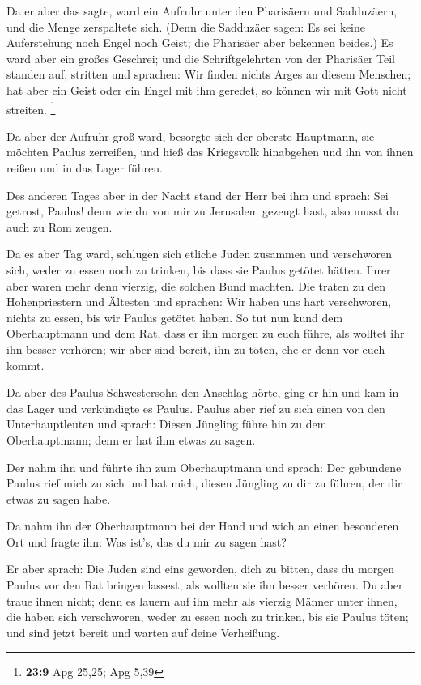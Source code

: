  Da er aber das sagte, ward ein Aufruhr unter den
Pharisäern und Sadduzäern, und die Menge zerspaltete sich.
 (Denn die Sadduzäer sagen: Es sei keine Auferstehung noch
Engel noch Geist; die Pharisäer aber bekennen beides.)  Es
ward aber ein großes Geschrei; und die Schriftgelehrten von der
Pharisäer Teil standen auf, stritten und sprachen: Wir finden nichts
Arges an diesem Menschen; hat aber ein Geist oder ein Engel mit ihm
geredet, so können wir mit Gott nicht streiten. \footnote{\textbf{23:9}
  Apg 25,25; Apg 5,39}

 Da aber der Aufruhr groß ward, besorgte sich der oberste
Hauptmann, sie möchten Paulus zerreißen, und hieß das Kriegsvolk
hinabgehen und ihn von ihnen reißen und in das Lager führen.

 Des anderen Tages aber in der Nacht stand der Herr bei
ihm und sprach: Sei getrost, Paulus! denn wie du von mir zu Jerusalem
gezeugt hast, also musst du auch zu Rom zeugen.

 Da es aber Tag ward, schlugen sich etliche Juden
zusammen und verschworen sich, weder zu essen noch zu trinken, bis dass
sie Paulus getötet hätten.  Ihrer aber waren mehr denn
vierzig, die solchen Bund machten.  Die traten zu den
Hohenpriestern und Ältesten und sprachen: Wir haben uns hart
verschworen, nichts zu essen, bis wir Paulus getötet haben.
 So tut nun kund dem Oberhauptmann und dem Rat, dass er
ihn morgen zu euch führe, als wolltet ihr ihn besser verhören; wir aber
sind bereit, ihn zu töten, ehe er denn vor euch kommt.

 Da aber des Paulus Schwestersohn den Anschlag hörte,
ging er hin und kam in das Lager und verkündigte es Paulus.
 Paulus aber rief zu sich einen von den Unterhauptleuten
und sprach: Diesen Jüngling führe hin zu dem Oberhauptmann; denn er hat
ihm etwas zu sagen.

 Der nahm ihn und führte ihn zum Oberhauptmann und
sprach: Der gebundene Paulus rief mich zu sich und bat mich, diesen
Jüngling zu dir zu führen, der dir etwas zu sagen habe.

 Da nahm ihn der Oberhauptmann bei der Hand und wich an
einen besonderen Ort und fragte ihn: Was ist's, das du mir zu sagen
hast?

 Er aber sprach: Die Juden sind eins geworden, dich zu
bitten, dass du morgen Paulus vor den Rat bringen lassest, als wollten
sie ihn besser verhören.  Du aber traue ihnen nicht; denn
es lauern auf ihn mehr als vierzig Männer unter ihnen, die haben sich
verschworen, weder zu essen noch zu trinken, bis sie Paulus töten; und
sind jetzt bereit und warten auf deine Verheißung.

